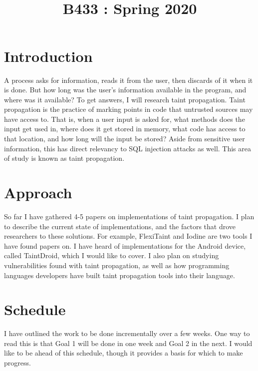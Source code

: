 \documentclass[11pt]{article}
\title{
    \vspace{2in}
    \textmd{\textbf{\tit}}\\
    \normalsize\vspace{0.1in}\small{B433 : Spring 2020 }\\
    \vspace{0.1in}\large{\textit{\auths}}
    \vspace{3in}
}
\date{}
\begin{document}


\section{Introduction}

A process asks for information, reads it from the 
user, then discards of it when it is done. But how long was the user's information 
available in the program, and where was it available? To get answers, I will research
taint propagation. Taint propagation is the practice of marking points in code
that untrusted sources may have access to. That is, when a user input is asked for,
what methods does the input get used in, where does it get stored in memory, what
code has access to that location, and how long will the input be stored?
Aside from sensitive user information, this has direct relevancy to SQL injection 
attacks as well. This area of study is known as taint propagation.

\section{Approach}
So far I have gathered 4-5 papers on implementations of taint propagation. 
I plan to describe the current state of implementations, and the factors that 
drove researchers to these solutions. For example, FlexiTaint and Iodine are two 
tools I have found papers on. I have heard of implementations for the 
Android device, called TaintDroid, which I would like to cover. I also plan on studying
vulnerabilities found with taint propagation, as well as how programming languages
developers have built taint propagation tools into their language. 

\section{Schedule}
I have outlined the work to be done incrementally over a few weeks.  
One way to read this is that Goal 1 will be done in one week and Goal 
2 in the next. I would like to be ahead of this schedule, though it 
provides a basis for which to make progress. \\
\end{document}

